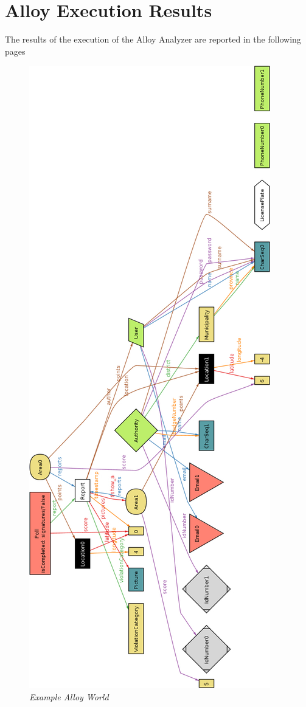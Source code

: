 \section{Alloy Execution Results}
The results of the execution of the Alloy Analyzer are reported in the following pages
\newpage

\begin{figure}[H]
  \centering
  \includegraphics[origin=c,width=\textwidth,height=.95\textheight,keepaspectratio]{RASD_Images/AlloyWorlds/show.jpg}
  \caption{\textit{Example Alloy World}}
\end{figure}

